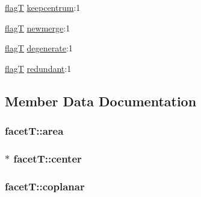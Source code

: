 \begin{DoxyCompactItemize}
\item 
\hyperlink{libqhull_8h_a0ff81862a2ab15dc96eb3803685cda2d}{flag\+T} \hyperlink{structfacetT_a6521bf1dbd063c54ce5639ffc808f9b7}{keepcentrum}\+:1
\item 
\hyperlink{libqhull_8h_a0ff81862a2ab15dc96eb3803685cda2d}{flag\+T} \hyperlink{structfacetT_a208f987160490fc720a3a278a2156e64}{newmerge}\+:1
\item 
\hyperlink{libqhull_8h_a0ff81862a2ab15dc96eb3803685cda2d}{flag\+T} \hyperlink{structfacetT_af8025344bbde2bc17a73ef3acadc2302}{degenerate}\+:1
\item 
\hyperlink{libqhull_8h_a0ff81862a2ab15dc96eb3803685cda2d}{flag\+T} \hyperlink{structfacetT_abeb6d9c8275d12f40512e8f61b84172e}{redundant}\+:1
\end{DoxyCompactItemize}


\subsection{Member Data Documentation}
\hypertarget{structfacetT_aaa7fd9175845daaaf3015f5964a9ce3d}{}
\subsubsection[{area}]{ facet\+T\+::area}\label{structfacetT_aaa7fd9175845daaaf3015f5964a9ce3d}
\hypertarget{structfacetT_a73c00e142225201e17ad6d8400608212}{}
\subsubsection[{center}]{$\ast$ facet\+T\+::center}\label{structfacetT_a73c00e142225201e17ad6d8400608212}
\hypertarget{structfacetT_acdd75648440e8c5c826a99b32635e3a1}{}
\subsubsection[{coplanar}]{ facet\+T\+::coplanar}\label{structfacetT_acdd75648440e8c5c826a99b32635e3a1}
\hypertarget{structfacetT_a926946e6924b7221234dbdd4f713f26d}{}
